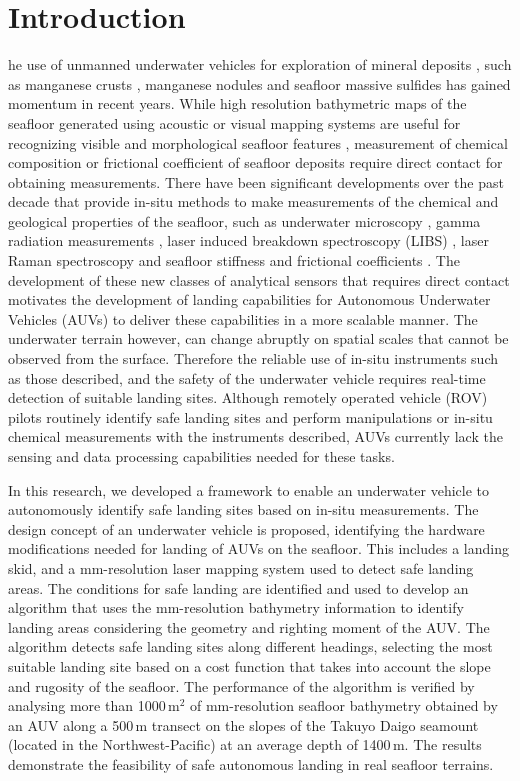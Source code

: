 \section{Introduction}

he use of unmanned underwater vehicles for exploration of mineral deposits \cite{Suzuki2015}, such as manganese crusts \cite{Usui2016}, manganese nodules \cite{Schoening2016} and seafloor massive sulfides \cite{Thornton2016} has gained momentum in recent years. While high resolution bathymetric maps of the seafloor generated using acoustic \cite{Moustier1993} or visual \cite{Roman2010} mapping systems are useful for recognizing visible and morphological seafloor features \cite{Pizarro2009,Maki2010}, measurement of chemical composition \cite{Takahashi2015} or frictional coefficient \cite{White2011} of seafloor deposits require direct contact for obtaining measurements. There have been significant developments over the past decade that provide in-situ methods to make measurements of the chemical and geological properties of the seafloor, such as underwater microscopy \cite{Rubin2007}, gamma radiation measurements \cite{Thornton2013a,Thornton2013}, laser induced breakdown spectroscopy (LIBS) \cite{Thornton2015}, laser Raman spectroscopy \cite{Brewer2004,Pasteris2004} and seafloor stiffness and frictional coefficients \cite{Stanier2015}. The development of these new classes of analytical sensors that requires direct contact motivates the development of landing capabilities for Autonomous Underwater Vehicles (AUVs) to deliver these capabilities in a more scalable manner. The underwater terrain however, can change abruptly on spatial scales that cannot be observed from the surface. Therefore the reliable use of in-situ instruments such as those described, and the safety of the underwater vehicle requires real-time detection of suitable landing sites. Although remotely operated vehicle (ROV) pilots routinely identify safe landing sites and perform manipulations or in-situ chemical measurements with the instruments described, AUVs currently lack the sensing and data processing capabilities needed for these tasks. 

In this research, we developed a framework to enable an underwater vehicle to autonomously identify safe landing sites based on in-situ measurements. The design concept of an underwater vehicle is proposed, identifying the hardware modifications needed for landing of AUVs on the seafloor. This includes a landing skid, and a mm-resolution laser mapping system used to detect safe landing areas. The conditions for safe landing are identified and used to develop an algorithm that uses the mm-resolution bathymetry information to identify landing areas considering the geometry and righting moment of the AUV. The algorithm detects safe landing sites along different headings, selecting the most suitable landing site based on a cost function that takes into account the slope and rugosity of the seafloor. The performance of the algorithm is verified by analysing more than 1000\,m$^2$ of mm-resolution seafloor bathymetry obtained by an AUV along a 500\,m transect on the slopes of the Takuyo Daigo seamount (located in the Northwest-Pacific) at an average depth of 1400\,m. The results demonstrate the feasibility of safe autonomous landing in real seafloor terrains.